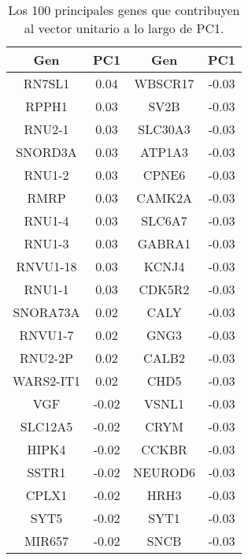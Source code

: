 
\chapter{}\label{apx:apx3}

	
	\begin{longtable}{|c|c||c|c|}
		\caption{Los 100 principales genes que contribuyen al vector unitario a lo largo de PC1.\label{tab:apx3}}\\
		
		\hline
		Gen & PC1 & Gen & PC1 \\ \hline
		\endhead
		
		RN7SL1 & 0.04 & WBSCR17 & -0.03 \\
		\hline
		RPPH1 & 0.03 & SV2B & -0.03 \\
		\hline
		RNU2-1 & 0.03 & SLC30A3 & -0.03 \\
		\hline
		SNORD3A & 0.03 & ATP1A3 & -0.03 \\
		\hline
		RNU1-2 & 0.03 & CPNE6 & -0.03 \\
		\hline
		RMRP & 0.03 & CAMK2A & -0.03 \\
		\hline
		RNU1-4 & 0.03 & SLC6A7 & -0.03 \\
		\hline
		RNU1-3 & 0.03 & GABRA1 & -0.03 \\
		\hline
		RNVU1-18 & 0.03 & KCNJ4 & -0.03 \\
		\hline
		RNU1-1 & 0.03 & CDK5R2 & -0.03 \\
		\hline
		SNORA73A & 0.02 & CALY & -0.03 \\
		\hline
		RNVU1-7 & 0.02 & GNG3 & -0.03 \\
		\hline
		RNU2-2P & 0.02 & CALB2 & -0.03 \\
		\hline
		WARS2-IT1 & 0.02 & CHD5 & -0.03 \\
		\hline
		VGF & -0.02 & VSNL1 & -0.03 \\
		\hline
		SLC12A5 & -0.02 & CRYM & -0.03 \\
		\hline
		HIPK4 & -0.02 & CCKBR & -0.03 \\
		\hline
		SSTR1 & -0.02 & NEUROD6 & -0.03 \\
		\hline
		CPLX1 & -0.02 & HRH3 & -0.03 \\
		\hline
		SYT5 & -0.02 & SYT1 & -0.03 \\
		\hline
		MIR657 & -0.02 & SNCB & -0.03 \\

\end{longtable}

